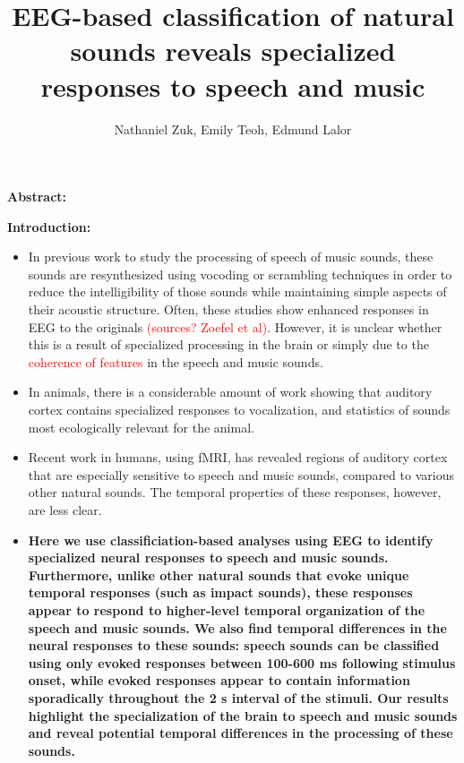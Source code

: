 \documentclass[11pt]{article}
\title{EEG-based classification of natural sounds reveals specialized responses to speech and music}
\author{Nathaniel Zuk, Emily Teoh, Edmund Lalor}
\begin{document}
\maketitle

\textbf{Abstract:}

\textbf{Introduction:}

\begin{itemize}
\item In previous work to study the processing of speech of music sounds, these sounds are resynthesized using vocoding or scrambling techniques in order to reduce the intelligibility of those sounds while maintaining simple aspects of their acoustic structure. Often, these studies show enhanced responses in EEG to the originals \textcolor{red}{(sources? Zoefel et al)}.  However, it is unclear whether this is a result of specialized processing in the brain or simply due to the \textcolor{red}{coherence of features} in the speech and music sounds.
\item In animals, there is a considerable amount of work showing that auditory cortex contains specialized responses to vocalization, and statistics of sounds most ecologically relevant for the animal.
\item Recent work in humans, using fMRI, has revealed regions of auditory cortex that are especially sensitive to speech and music sounds, compared to various other natural sounds.  The temporal properties of these responses, however, are less clear.
\item \textbf{Here we use classificiation-based analyses using EEG to identify specialized neural responses to speech and music sounds.  Furthermore, unlike other natural sounds that evoke unique temporal responses (such as impact sounds), these responses appear to respond to higher-level temporal organization of the speech and music sounds.  We also find temporal differences in the neural responses to these sounds: speech sounds can be classified using only evoked responses between 100-600 ms following stimulus onset, while evoked responses appear to contain information sporadically throughout the 2 s interval of the stimuli.  Our results highlight the specialization of the brain to speech and music sounds and reveal potential temporal differences in the processing of these sounds.}
\end{itemize}
\end{document}
